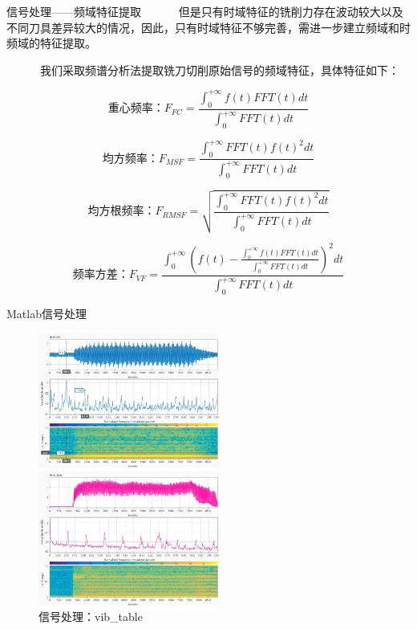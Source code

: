 % 
% 
\begin{frame}{信号处理——频域特征提取}
\ \ \ \ \ \ 但是只有时域特征的铣削力存在波动较大以及不同刀具差异较大的情况，因此，只有时域特征不够完善，需进一步建立频域和时频域的特征提取。\par
\ \ \ \ \ \ 我们采取频谱分析法提取铣刀切削原始信号的频域特征，具体特征如下：
\begin{minipage}[t]{0.45\textwidth}
\centering
$$ 重心频率：F_{FC}=\frac{\int_{0}^{+\infty}f(t)FFT(t)dt}{\int_{0}^{+\infty} FFT(t)dt} $$\par

\end{minipage}
\begin{minipage}[t]{0.45\textwidth}
\centering
$$ 均方频率：F_{MSF}=\frac{\int_{0}^{+\infty} FFT(t)f(t)^{2}dt}{\int_{0}^{+\infty}FFT(t)dt} $$\par
\end{minipage}
$$ 均方根频率：F_{RMSF}=\sqrt{\frac{\int_{0}^{+\infty}FFT(t)f(t)^{2}dt}{\int_{0}^{+\infty}FFT(t)dt}} $$ \par
$$ 频率方差： F_{VF}=\frac{\int_{0}^{+\infty}(f(t)-\frac{\int_{0}^{+\infty}f(t)FFT(t)dt}{\int_{0}^{+\infty}FFT(t)dt} )^{2}dt}{\int_{0}^{+\infty}FFT(t)dt}  $$ \par
\end{frame}
% 
% 
\begin{frame}{Matlab信号处理}
\begin{figure}[htbp]
\begin{minipage}[t]{0.48\textwidth}
\centering
\includegraphics[width=6cm]{刀具磨损量预测神经网络/smcAC.jpg}
\caption{信号处理：smcAC}
\end{minipage}
\begin{minipage}[t]{0.48\textwidth}
\centering
\includegraphics[width=6cm]{刀具磨损量预测神经网络/vib_table.jpg}
  \caption{信号处理：vib\_table}
\end{minipage}
\end{figure}
\end{frame}
